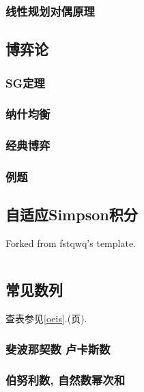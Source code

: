 \documentclass[a4paper, twoside]{article}
\begin{document}
\begin{multicols}{2}
				\subsubsection{线性规划对偶原理}
					
			
			\subsection{博弈论}
				\subsubsection{SG定理}
					

				\subsubsection{纳什均衡}
					

				\subsubsection{经典博弈}
					\label{classicgame}
					

				\subsubsection{例题}
					

			\subsection{自适应Simpson积分}
				Forked from fstqwq's template.
				\inputminted{cpp}{../src/math/simpson.cpp}

			\subsection{常见数列}
				查表参见\ref{oeis}.(\pageref{oeis}页).

				\subsubsection{斐波那契数 卢卡斯数}
					

				\subsubsection{伯努利数, 自然数幂次和}
					\label{bernoulli}
					
				

\end{multicols}
\end{document}

